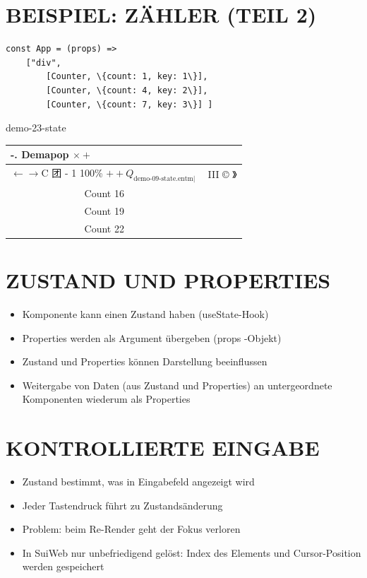 \documentclass[10pt]{article}
\begin{document}
\section*{BEISPIEL: ZÄHLER (TEIL 2)}
\begin{verbatim}
const App = (props) =>
    ["div",
        [Counter, \{count: 1, key: 1\}],
        [Counter, \{count: 4, key: 2\}],
        [Counter, \{count: 7, key: 3\}] ]
\end{verbatim}

demo-23-state

\begin{center}
\begin{tabular}{|c|c|}
\hline
\multicolumn{2}{|l|}{-. Demapop $\times+$} \\
\hline
$\leftarrow \rightarrow \mathrm{C}$ 团 - 1 100\% $++Q_{\text {demo-09-state.entm| }}$ & III © 》 \\
\hline
Count 16 &  \\
\hline
Count 19 &  \\
\hline
Count 22 &  \\
\hline
\end{tabular}
\end{center}

\section*{ZUSTAND UND PROPERTIES}
\begin{itemize}
  \item Komponente kann einen Zustand haben (useState-Hook)
  \item Properties werden als Argument übergeben (props -Objekt)
  \item Zustand und Properties können Darstellung beeinflussen
  \item Weitergabe von Daten (aus Zustand und Properties) an untergeordnete Komponenten wiederum als Properties
\end{itemize}

\section*{KONTROLLIERTE EINGABE}
\begin{itemize}
  \item Zustand bestimmt, was in Eingabefeld angezeigt wird
  \item Jeder Tastendruck führt zu Zustandsänderung
  \item Problem: beim Re-Render geht der Fokus verloren
  \item In SuiWeb nur unbefriedigend gelöst: Index des Elements und Cursor-Position werden gespeichert
\end{itemize}
\end{document}
